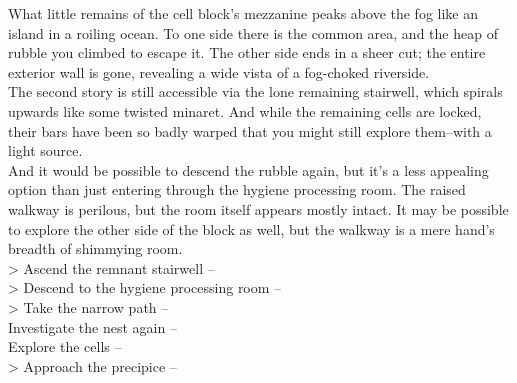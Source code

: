 What little remains of the cell block’s mezzanine peaks above the fog like an island in a roiling ocean. To one side there is the common area, and the heap of rubble you climbed to escape it. The other side ends in a sheer cut; the entire exterior wall is gone, revealing a wide vista of a fog-choked riverside.\\

The second story is still accessible via the lone remaining stairwell, which spirals upwards like some twisted minaret. And while the remaining cells are locked, their bars have been so badly warped that you might still explore them--with a light source.\\

And it would be possible to descend the rubble again, but it’s a less appealing option than just entering through the hygiene processing room. The raised walkway is perilous, but the room itself appears mostly intact. It may be possible to explore the other side of the block as well, but the walkway is a mere hand’s breadth of shimmying room.\\

> Ascend the remnant stairwell -- \\
> Descend to the hygiene processing room -- \\
> Take the narrow path -- \\
 Investigate the nest again -- \\
 Explore the cells -- \\
> Approach the precipice -- \\